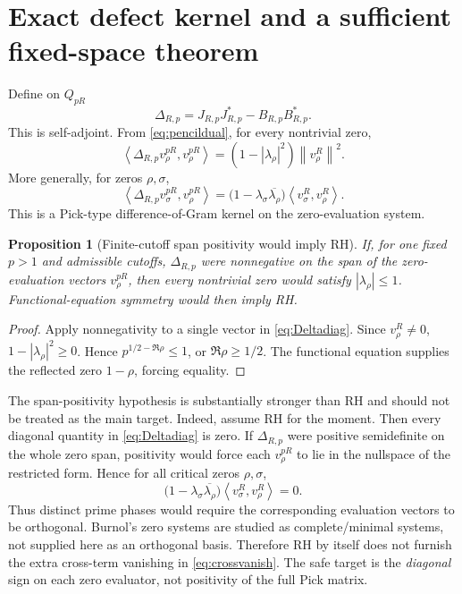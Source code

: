 \documentclass[11pt]{article}
\newtheorem{proposition}[theorem]{Proposition}
\theoremstyle{remark}
\newcommand{\norm}[1]{\left\lVert #1\right\rVert}
\newcommand{\ip}[2]{\left\langle #1,#2\right\rangle}
\begin{document}
\section{Exact defect kernel and a sufficient fixed-space theorem}
Define on $Q_{pR}$
\begin{equation}\label{eq:Delta}
 \Delta_{R,p}=J_{R,p}J_{R,p}^*-B_{R,p}B_{R,p}^*.
\end{equation}
This is self-adjoint. From \eqref{eq:pencildual}, for every nontrivial zero,
\begin{equation}\label{eq:Deltadiag}
 \ip{\Delta_{R,p}v_\rho^{pR}}{v_\rho^{pR}}
 =(1-|\lambda_\rho|^2)\norm{v_\rho^R}^2.
\end{equation}
More generally, for zeros $\rho,\sigma$,
\begin{equation}\label{eq:Pick}
 \ip{\Delta_{R,p}v_\sigma^{pR}}{v_\rho^{pR}}
 =\bigl(1-\lambda_\sigma\overline{\lambda_\rho}\bigr)
   \ip{v_\sigma^R}{v_\rho^R}.
\end{equation}
This is a Pick-type difference-of-Gram kernel on the zero-evaluation system.

\begin{proposition}[Finite-cutoff span positivity would imply RH]\label{prop:positivity}
If, for one fixed $p>1$ and admissible cutoffs, $\Delta_{R,p}$ were nonnegative on the span of the zero-evaluation vectors $v_\rho^{pR}$, then every nontrivial zero would satisfy $|\lambda_\rho|\le1$. Functional-equation symmetry would then imply RH.
\end{proposition}

\begin{proof}
Apply nonnegativity to a single vector in \eqref{eq:Deltadiag}. Since $v_\rho^R\ne0$,
$1-|\lambda_\rho|^2\ge0$. Hence $p^{1/2-\Re\rho}\le1$, or $\Re\rho\ge1/2$. The functional equation supplies the reflected zero $1-\rho$, forcing equality.
\end{proof}

The span-positivity hypothesis is substantially stronger than RH and should not be treated as the main target. Indeed, assume RH for the moment. Then every diagonal quantity in \eqref{eq:Deltadiag} is zero. If $\Delta_{R,p}$ were positive semidefinite on the whole zero span, positivity would force each $v_\rho^{pR}$ to lie in the nullspace of the restricted form. Hence for all critical zeros $\rho,\sigma$,
\begin{equation}\label{eq:crossvanish}
 \bigl(1-\lambda_\sigma\overline{\lambda_\rho}\bigr)
 \ip{v_\sigma^R}{v_\rho^R}=0.
\end{equation}
Thus distinct prime phases would require the corresponding evaluation vectors to be orthogonal. Burnol's zero systems are studied as complete/minimal systems, not supplied here as an orthogonal basis. Therefore RH by itself does not furnish the extra cross-term vanishing in \eqref{eq:crossvanish}. The safe target is the \emph{diagonal} sign on each zero evaluator, not positivity of the full Pick matrix.
\end{document}
